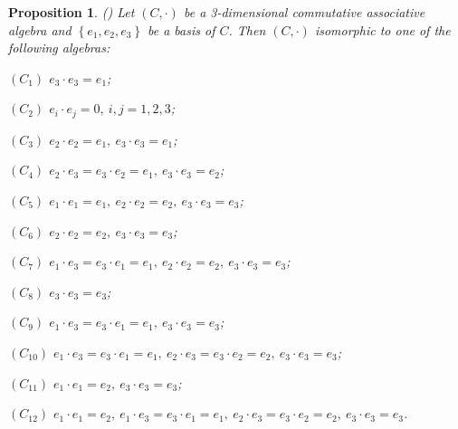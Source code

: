 \documentclass[12pt, reqno]{amsart}
\theoremstyle{plain}
\newtheorem{proposition}[theorem]{Proposition}
\begin{document}
\begin{proposition}\label{commutative 3 dim pre-Lie algebra}\rm{(\cite{Bai-1})}
Let $\left(C, \cdot\right)$ be a 3-dimensional commutative associative algebra and $\left\{e_{1}, e_{2}, e_{3}\right\}$ be a basis of $C$. Then $(C,\cdot)$ isomorphic to  one of the
following algebras:

$(C_1)$ $e_3\cdot e_3=e_1$;

$(C_2)$ $e_i\cdot e_j=0,~i,j=1,2,3$;

$(C_3)$ $e_2\cdot e_2=e_1,~e_3\cdot e_3=e_1$;

$(C_4)$ $e_2\cdot e_3=e_3\cdot e_2=e_1,~e_3\cdot e_3=e_2$;

$(C_5)$ $e_1\cdot e_1=e_1,~e_2\cdot e_2=e_2,~e_3\cdot e_3=e_3$;

$(C_6)$ $e_2\cdot e_2=e_2,~e_3\cdot e_3=e_3$;

$(C_7)$ $e_1\cdot e_3=e_3\cdot e_1=e_1,~e_2\cdot e_2=e_2,~e_3\cdot e_3=e_3$;

$(C_8)$ $e_3\cdot e_3=e_3$;

$(C_9)$ $e_1\cdot e_3=e_3\cdot e_1=e_1,~e_3\cdot e_3=e_3$;

$(C_{10})$ $e_1\cdot e_3=e_3\cdot e_1=e_1,~e_2\cdot e_3=e_3\cdot e_2=e_2,~e_3\cdot e_3=e_3$;

$(C_{11})$ $e_1\cdot e_1=e_2,~e_3\cdot e_3=e_3$;

$(C_{12})$ $e_1\cdot e_1=e_2,~e_1\cdot e_3=e_3\cdot e_1=e_1,~e_2\cdot e_3=e_3\cdot e_2=e_2,~e_3\cdot e_3=e_3$.
\end{proposition}
\end{document}
